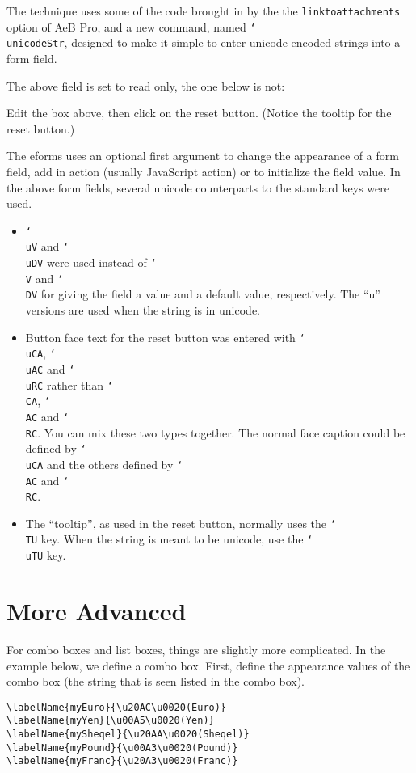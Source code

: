 \documentclass{article}
\newcommand{\cs}[1]{\texttt{\char`\\#1}}
\begin{document}
The technique uses some of the code brought in by the the
\texttt{linktoattachments} option of AeB Pro, and a new command,
named \cs{unicodeStr}, designed to make it simple to enter unicode
encoded strings into a form field.

The above field is set to read only, the one below is not:


Edit the box above, then click on the reset button. (Notice the
tooltip for the reset button.)

The eforms uses an optional first argument to change the appearance
of a form field, add in action (usually JavaScript action) or to
initialize the field value. In the above form fields, several
unicode counterparts to the standard keys were used.
\begin{itemize}
    \item \cs{uV} and \cs{uDV} were used instead of \cs{V} and
    \cs{DV} for giving the field a value and a default value,
    respectively. The ``u'' versions are used when the string is in
    unicode.

    \item Button face text for the reset button was entered with
    \cs{uCA}, \cs{uAC} and \cs{uRC} rather than \cs{CA}, \cs{AC} and
    \cs{RC}. You can mix these two types together. The normal face
    caption could be defined by \cs{uCA} and the others defined by
    \cs{AC} and \cs{RC}.

    \item The ``tooltip'', as used in the reset button, normally uses
    the \cs{TU} key. When the string is meant to be unicode, use the
    \cs{uTU} key.
\end{itemize}

\section{More Advanced}

For combo boxes and list boxes, things are slightly more
complicated. In the example below, we define a combo box. First,
define the appearance values of the combo box (the string that is
seen listed in the combo box).
\begin{verbatim}
\labelName{myEuro}{\u20AC\u0020(Euro)}
\labelName{myYen}{\u00A5\u0020(Yen)}
\labelName{mySheqel}{\u20AA\u0020(Sheqel)}
\labelName{myPound}{\u00A3\u0020(Pound)}
\labelName{myFranc}{\u20A3\u0020(Franc)}
\end{verbatim}
\end{document}
